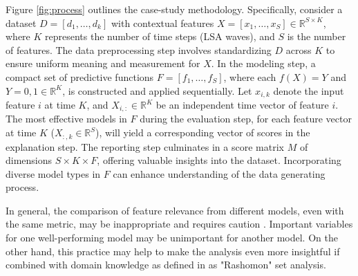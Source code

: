Figure \ref{fig:process} outlines the case-study methodology. Specifically, consider a dataset \( D = [d_1, \ldots, d_k] \) with contextual features \( X = [x_1, \ldots, x_S] \in \mathbb{R}^{S \times K} \), where \( K \) represents the number of time steps (LSA waves), and \( S \) is the number of features. The data preprocessing step involves standardizing \( D \) across \( K \) to ensure uniform meaning and measurement for \( X \). In the modeling step, a compact set of predictive functions \( F = [f_1, \ldots, f_S] \), where each \( f(X) = Y \) and \( Y = {0,1} \in \mathbb{R}^K \), is constructed and applied sequentially. Let \( x_{i,k} \) denote the input feature \( i \) at time \( K \), and \( X_{i,:} \in \mathbb{R}^K \) be an independent time vector of feature \( i \). The most effective models in \( F \) during the evaluation step, for each feature vector at time \( K \) (\( X_{:,k} \in \mathbb{R}^S \)), will yield a corresponding vector of scores in the explanation step. The reporting step culminates in a score matrix \( M \) of dimensions \( S \times K \times F \), offering valuable insights into the dataset. Incorporating diverse model types in \( F \) can enhance understanding of the data generating process.

In general, the comparison of feature relevance from different models, even with the same metric, may be inappropriate and requires caution \cite{Fisher2018AllSimultaneously}. Important variables for one well-performing model may be unimportant for another model. On the other hand, this practice may help to make the analysis even more insightful if combined with domain knowledge as defined in \cite{SilvaFilho2023AAchievement} as "Rashomon" set analysis.







